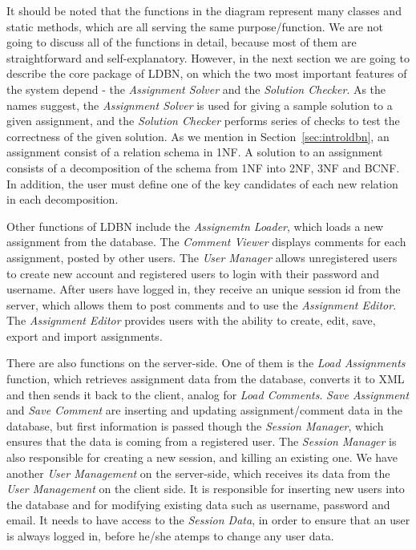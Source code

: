 It should be noted that the functions in the diagram represent many classes and 
static methods, which are all serving the same purpose/function. We are not 
going to discuss all 
of the functions in detail, because most of them are straightforward and 
self-explanatory. 
However, in the next section we are going to describe the core package of LDBN,
on which the two most important features of the system depend - 
the \textit{Assignment Solver} and the \textit{Solution Checker}. 
As the names suggest, the 
\textit{Assignment Solver} is used
for giving a sample solution to a given assignment, and the \textit{Solution Checker}
performs series of checks to test the correctness of the given solution.
As we mention in Section~\ref{sec:introldbn}, an assignment consist of a 
relation schema in 1NF. A solution to an assignment consists 
of a decomposition of the schema from 1NF into 2NF, 3NF and BCNF. In addition,
the user must define one of the key candidates of each new relation in each
decomposition. 

Other functions of LDBN include the \textit{Assignemtn Loader}, which loads 
a new assignment from the database. The \textit{Comment Viewer} displays comments for
each assignment, posted by other users. The \textit{User Manager} 
allows unregistered users to create new account and registered users to login with 
their password and username. After users have logged in, they receive an unique 
session id from the server, which allows them to post comments and to use the 
\textit{Assignment Editor}. The \textit{Assignment Editor} provides users with 
the ability to create, edit, save, export and import assignments. 

There are also functions on the server-side. One of them is 
the \textit{Load Assignments} function, which retrieves assignment data from the database,
converts it to XML and then sends it back to the client, analog for \textit{Load Comments}.
\textit{Save Assignment} and \textit{Save Comment} are inserting and updating assignment/comment data in the database, but
first information is passed though the \textit{Session Manager}, which ensures that the data
is coming from a registered user. The \textit{Session Manager} is also responsible for creating
a new session, and killing an existing one. We have another \textit{User Management} on the server-side, which
receives its data from the \textit{User Management} on the client side. It is responsible 
for inserting new users into the database and for modifying existing data such as username, password and email.
It needs to have access to the \textit{Session Data}, in order to ensure that an 
user is always logged in,
before he/she atemps to change any user data.    

